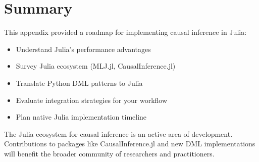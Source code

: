 \section{Summary}\label{sec:app_summary}

This appendix provided a roadmap for implementing causal inference in Julia:


\vspace{1em}

\begin{tcolorbox}[colback=gray!5, colframe=gray!75, title={Appendix Checklist}]
\begin{itemize}
    \item[$\square$] Understand Julia's performance advantages
    \item[$\square$] Survey Julia ecosystem (MLJ.jl, CausalInference.jl)
    \item[$\square$] Translate Python DML patterns to Julia
    \item[$\square$] Evaluate integration strategies for your workflow
    \item[$\square$] Plan native Julia implementation timeline
\end{itemize}
\end{tcolorbox}

The Julia ecosystem for causal inference is an active area of development. Contributions to packages like CausalInference.jl and new DML implementations will benefit the broader community of researchers and practitioners.

